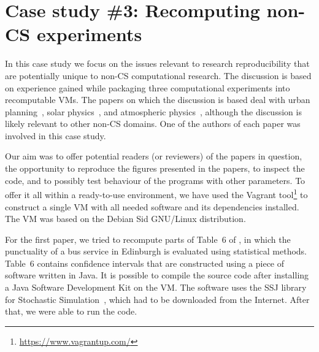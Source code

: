 \section{Case study \#3: Recomputing non-CS experiments}
\label{s:group3}

In this case study we focus on the issues relevant to research reproducibility that are potentially 
  unique to non-CS computational research.
The discussion is based on experience gained while packaging three computational experiments 
  into recomputable VMs.
The papers on which the discussion is based 
  deal with urban planning~\cite{danielpaper}, solar
  physics~\cite{bareford2010nanoflare}, and atmospheric
  physics~\cite{arabas2013libcloud},
  although the discussion is likely relevant to other non-CS domains. One of the
  authors of each paper was involved in this case study.


Our aim was to offer potential readers (or reviewers) of the papers in question, 
  the opportunity to reproduce the figures presented in the papers, 
  to inspect the code, and to possibly test behaviour of the programs with other parameters.
To offer it all within a ready-to-use environment, we have used the Vagrant
tool\footnote{\url{https://www.vagrantup.com/}}
to
  construct a single VM with all needed software and its dependencies installed.
The VM was based on the Debian Sid GNU/Linux distribution.


For the first paper, we tried to recompute parts of Table~6 of
\cite{danielpaper}, in which the punctuality of a bus service in Edinburgh is
evaluated using statistical methods. Table~6 contains confidence intervals that
are constructed using a piece of software written in Java. It is possible to
compile the source code after installing a Java Software Development Kit on the
VM. The software uses the SSJ library for Stochastic
Simulation~\cite{ssj},
which had to be downloaded from the Internet. After that, we were able to run
the code.

